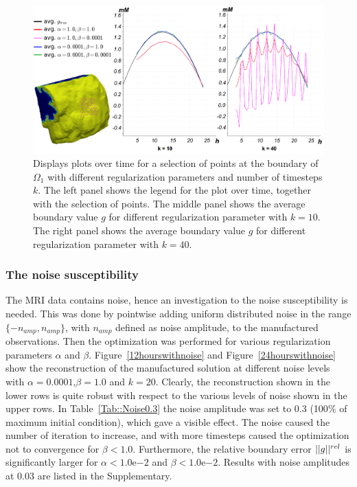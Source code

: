 \documentclass[12pt,a4paper]{article}
\begin{document}

\begin{figure}
\centering
\includegraphics[scale=0.21]{boundary_control.png}  
\caption{ Displays plots over time for a selection of points at the boundary of $\Omega_1$ with different regularization parameters and number of timesteps $k$. The left panel shows the legend for the plot over time, together with the selection of points. The middle panel shows the average boundary value $g$ for different regularization parameter with $k=10$. The right panel shows the average boundary value $g$ for different regularization parameter with $k=40$.  }
\label{boundarycontrol}
\end{figure}

\subsubsection{The noise susceptibility}
The MRI data contains noise, hence an investigation to the noise susceptibility is needed. This was done by pointwise adding uniform distributed noise in the range $\lbrace -n_{amp} , n_{amp} \rbrace $, with $n_{amp}$ defined as noise amplitude, to the manufactured observations. Then the optimization was performed for various regularization parameters $\alpha$ and $\beta$. Figure~\ref{12hourswithnoise} and Figure~\ref{24hourswithnoise} show the reconstruction of the manufactured solution at
different noise levels with $\alpha=0.0001$,$\beta=1.0$ and $k=20$. Clearly, the reconstruction shown in the lower rows is quite robust with respect to the various levels
of noise shown in the upper rows.      
In Table~\ref{Tab::Noise0.3} the noise amplitude was set to 0.3 (100$\%$ of maximum initial condition), which gave a visible effect. The noise caused the number of iteration to increase, and with more timesteps caused the optimization not to convergence for $\beta < 1.0$. Furthermore, the relative boundary error $||g||\sp{rel}$ is significantly larger for $\alpha< 1.0\mathrm{e}{-2} $ and $\beta < 1.0\mathrm{e}{-2}$. Results with noise  amplitudes at 0.03 are listed in the Supplementary. 
\end{document}

